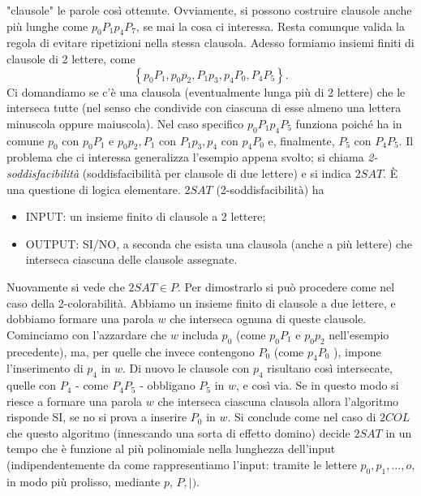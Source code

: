 \begin{enumerate}
          "clausole" le parole così ottenute. Ovviamente, si possono costruire clausole
          anche più lunghe come $p_0 P_1 p_4 P_7$, se mai la cosa ci interessa. Resta
          comunque valida la regola di evitare ripetizioni nella stessa clausola. Adesso
          formiamo insiemi finiti di clausole di 2 lettere, come
          $$
              \left\{p_0 P_1, p_0 p_2, P_1 p_3, p_4 P_0, P_4 P_5\right\} .
          $$
          Ci domandiamo se c'è una clausola (eventualmente lunga più di 2 lettere) che le
          interseca tutte (nel senso che condivide con ciascuna di esse almeno una lettera
          minuscola oppure maiuscola). Nel caso specifico $p_0 P_1 p_4 P_5$ funziona
          poiché ha in comune $p_0$ con $p_0 P_1$ e $p_0 p_2, P_1$ con $P_1 p_3, p_4$ con
          $p_4 P_0$ e, finalmente, $P_5$ con $P_4 P_5$. Il problema che ci interessa
          generalizza l'esempio appena svolto; si chiama \textit{2-soddisfacibilità}
          (soddisfacibilità per clausole di due lettere) e si indica $2 S A T$. È una
          questione di logica elementare. $2 S A T$ (2-soddisfacibilità) ha

          \begin{itemize}
              \item INPUT: un insieme finito di clausole a 2 lettere;
              \item OUTPUT: SI/NO, a seconda che esista una clausola (anche a più lettere) che
                    interseca ciascuna delle clausole assegnate.
          \end{itemize}

          Nuovamente si vede che $2 S A T \in P$. Per dimostrarlo si può
          procedere come nel caso della 2-colorabilità. Abbiamo un insieme
          finito di clausole a due lettere, e dobbiamo formare una parola $w$
          che interseca ognuna di queste clausole. Cominciamo con l'azzardare
          che $w$ includa $p_0$ (come $p_0 P_1$ e $p_0 p_2$ nell'esempio
          precedente), ma, per quelle che invece contengono $P_0$ (come $p_4
              P_0$ ), impone l'inserimento di $p_4$ in $w$. Di nuovo le clausole con
          $p_4$ risultano così intersecate, quelle con $P_4$ - come $P_4 P_5$ -
          obbligano $P_5$ in $w$, e così via. Se in questo modo si riesce a
          formare una parola $w$ che interseca ciascuna clausola allora
          l'algoritmo risponde SI, se no si prova a inserire $P_0$ in $w$. Si
          conclude come nel caso di $2 C O L$ che questo algoritmo (innescando
          una sorta di effetto domino) decide $2 S A T$ in un tempo che è
          funzione al più polinomiale nella lunghezza dell'input
          (indipendentemente da come rappresentiamo l'input: tramite le lettere
          $p_0, p_1, \ldots, o$, in modo più prolisso, mediante $p$, $P,
              \mid)$.\\


\end{enumerate}
